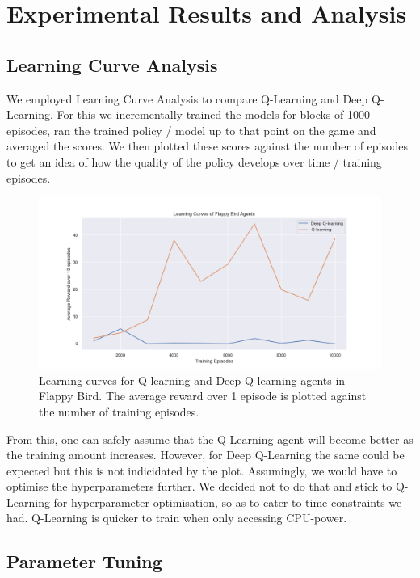 \documentclass[a4paper,12pt]{article}
\begin{document}
\section{Experimental Results and Analysis}
\subsection{Learning Curve Analysis}
We employed Learning Curve Analysis to compare Q-Learning and Deep Q-Learning. For this we incrementally trained the models
for blocks of 1000 episodes, ran the trained policy / model up to that point on the game and averaged the scores. We then
plotted these scores against the number of episodes to get an idea of how the quality of the policy develops over time / training
episodes.

\begin{figure}[H]
    \centering
    \includegraphics[width=\textwidth]{training_deepq_vs_q_avg10samples.png}
    \caption{Learning curves for Q-learning and Deep Q-learning agents in Flappy Bird. The average reward over 1 episode is plotted against the number of training episodes.}
    \label{fig:learning_curves}
\end{figure}

From this, one can safely assume that the Q-Learning agent will become better as the training amount increases. However,
for Deep Q-Learning the same could be expected but this is not indicidated by the plot. Assumingly, we would have to optimise the
hyperparameters further. We decided not to do that and stick to Q-Learning for hyperparameter optimisation, so as to cater to time constraints we had.
Q-Learning is quicker to train when only accessing CPU-power.

\subsection{Parameter Tuning}
\end{document}
